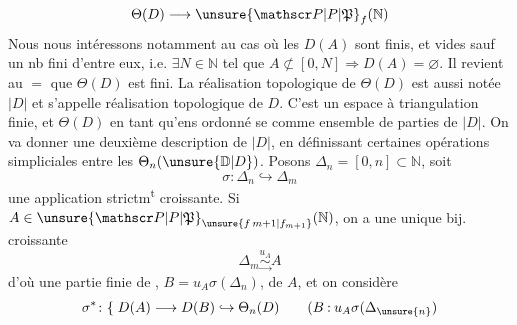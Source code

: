 \[
\Theta(D)\longrightarrow\unsure{\mathscr P|P|\mathfrak P}_{f}(\mathbb N)
\]
Nous nous intéressons notamment au cas où les $D(A)$ sont finis, et vides sauf un nb fini d'entre eux, i.e. $\exists N\in\mathbb N$ tel que $A\not\subset[0,N]\Longrightarrow D(A)=\varnothing$. Il revient au $=$ que $\Theta(D)$ est fini.
La réalisation topologique  de $\Theta(D)$  est aussi notée $|D|$ et s'appelle réalisation topologique de $D$.
C'est un espace à triangulation finie,  et $\Theta(D)$ en tant qu'ens ordonné se  comme ensemble de parties de $|D|$.
On va donner une deuxième description de $|D|$, en définissant certaines opérations simpliciales entre les $\Theta_n(\unsure{\mathbb D|D})$.
Posons $\Delta_n=[0,n]\subset\mathbb N$, soit
\[
\sigma\colon\Delta_n\hookrightarrow\Delta_m
\]
une application strictm\textsuperscript{t} croissante. Si
$A\in\unsure{\mathscr P|P|\mathfrak P}_{\unsure{f\,m+1|f_{m+1}}}(\mathbb N)$, on a une unique bij. croissante
\[
\Delta_m\overset{u_A}{\underset{\longrightarrow}{\sim}} A
\]
d'où une partie finie de  , $B=u_A\sigma(\Delta_n)$, de $A$, et on considère
\[
\sigma^*\colon\{\;D(A)\longrightarrow D(B)\hookrightarrow\Theta_n(D)
\qquad (B\mathbin{:}u_A\sigma(\Delta_{\unsure{n}})
\]
